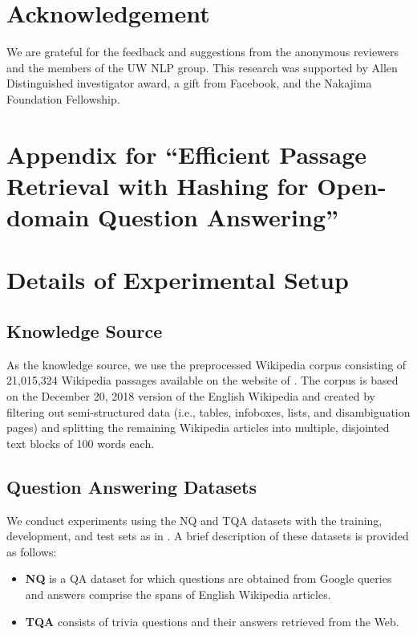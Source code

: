\documentclass[11pt,a4paper]{article}
\begin{document}
\section*{Acknowledgement}
We are grateful for the feedback and suggestions from the anonymous reviewers and the members of the UW NLP group. This research was supported by Allen Distinguished investigator award, a gift from Facebook, and the Nakajima Foundation Fellowship.




\appendix
\clearpage

\section*{Appendix for ``Efficient Passage Retrieval with Hashing for Open-domain Question Answering''}

\section{Details of Experimental Setup}
\label{sec:detail-experimental-setup}

\subsection{Knowledge Source}
As the knowledge source,  we use the preprocessed Wikipedia corpus consisting of 21,015,324 Wikipedia passages available on the website of \citet{Karpukhin2020DenseAnswering}.
The corpus is based on the December 20, 2018 version of the English Wikipedia and created by filtering out semi-structured data (i.e., tables, infoboxes, lists, and disambiguation pages) and splitting the remaining Wikipedia articles into multiple, disjointed text blocks of 100 words each.

\subsection{Question Answering Datasets}
\label{sec:dataset-datails}
We conduct experiments using the NQ and TQA datasets with the training, development, and test sets as in \citet{Lee2019LatentAnswering,Karpukhin2020DenseAnswering}.
A brief description of these datasets is provided as follows:

\begin{itemize}[leftmargin=10pt,topsep=1pt,itemsep=0pt]
\item \textbf{NQ} is a QA dataset for which questions are obtained from Google queries and answers comprise the spans of English Wikipedia articles.
\item \textbf{TQA} consists of trivia questions and their answers retrieved from the Web.
\end{itemize}
\end{document}

